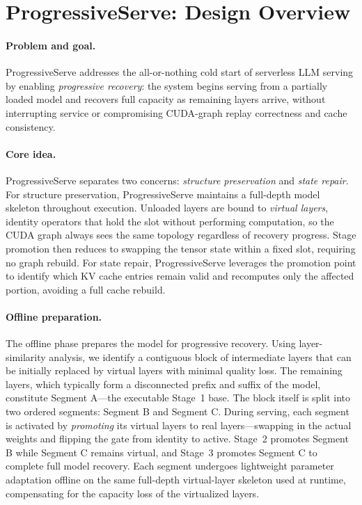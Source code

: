\documentclass[sigplan,anonymous,review,nonacm]{acmart}
\begin{document}
\section{ProgressiveServe: Design Overview}
\label{sec:design_overview}

\paragraph{Problem and goal.}
ProgressiveServe addresses the all-or-nothing cold start of serverless LLM serving by enabling \emph{progressive recovery}: the system begins serving from a partially loaded model and recovers full capacity as remaining layers arrive, without interrupting service or compromising CUDA-graph replay correctness and cache consistency.

\paragraph{Core idea.}
ProgressiveServe separates two concerns: \emph{structure preservation} and \emph{state repair}. For structure preservation, ProgressiveServe maintains a full-depth model skeleton throughout execution. Unloaded layers are bound to \emph{virtual layers}, identity operators that hold the slot without performing computation, so the CUDA graph always sees the same topology regardless of recovery progress. Stage promotion then reduces to swapping the tensor state within a fixed slot, requiring no graph rebuild. For state repair, ProgressiveServe leverages the promotion point to identify which KV cache entries remain valid and recomputes only the affected portion, avoiding a full cache rebuild.

\paragraph{Offline preparation.}
The offline phase prepares the model for progressive recovery. Using layer-similarity analysis, we identify a contiguous block of intermediate layers that can be initially replaced by virtual layers with minimal quality loss. The remaining layers, which typically form a disconnected prefix and suffix of the model, constitute Segment A---the executable Stage~1 base. The block itself is split into two ordered segments: Segment B and Segment C. During serving, each segment is activated by \emph{promoting} its virtual layers to real layers---swapping in the actual weights and flipping the gate from identity to active. Stage~2 promotes Segment B while Segment C remains virtual, and Stage~3 promotes Segment C to complete full model recovery. Each segment undergoes lightweight parameter adaptation offline on the same full-depth virtual-layer skeleton used at runtime, compensating for the capacity loss of the virtualized layers.
\end{document}
